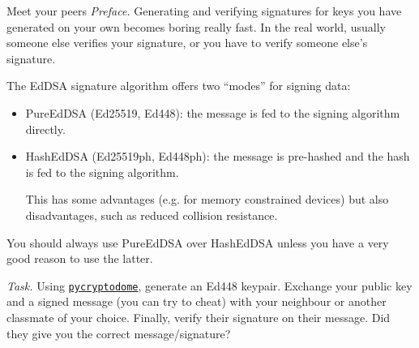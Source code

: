 \documentclass{practice}
\begin{document}
\begin{task}{Meet your peers}
  \textit{Preface.}
  Generating and verifying signatures for keys you have generated on your own becomes boring really fast.
  In the real world, usually someone else verifies your signature, or you have to verify someone else's signature.

  The EdDSA signature algorithm offers two \enquote{modes}\footnotemark{} for signing data:
  \begin{itemize}
    \item PureEdDSA (Ed25519, Ed448): the message is fed to the signing algorithm directly.
    \item HashEdDSA (Ed25519ph, Ed448ph): the message is pre-hashed and the hash is fed to the signing algorithm.
    
    This has some advantages (e.g. for memory constrained devices) but also disadvantages, such as reduced collision resistance.
  \end{itemize}
  You should always use PureEdDSA over HashEdDSA unless you have a very good reason to use the latter.

  \textit{Task.}
  Using \href{https://pycryptodome.readthedocs.io/en/latest/src/signature/eddsa.html}{\texttt{pycryptodome}}, generate an Ed448 keypair.
  Exchange your public key and a signed message (you can try to cheat) with your neighbour or another classmate of your choice.
  Finally, verify their signature on their message.
  Did they give you the correct message/signature?
\end{task}
\end{document}
